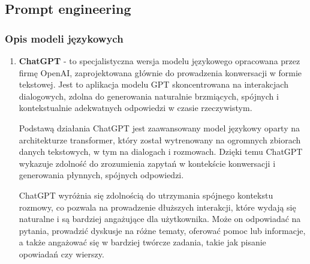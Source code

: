 \clearpage

\subsection{Prompt engineering}

\subsubsection{Opis modeli językowych}

\begin{enumerate}
 \item {\bf ChatGPT} - to specjalistyczna wersja modelu językowego opracowana przez firmę OpenAI, zaprojektowana głównie do prowadzenia konwersacji w formie tekstowej. Jest to aplikacja modelu GPT skoncentrowana na interakcjach dialogowych, zdolna do generowania naturalnie brzmiących, spójnych i kontekstualnie adekwatnych odpowiedzi w czasie rzeczywistym.

    Podstawą działania ChatGPT jest zaawansowany model językowy oparty na architekturze transformer, który został wytrenowany na ogromnych zbiorach danych tekstowych, w tym na dialogach i rozmowach. Dzięki temu ChatGPT wykazuje zdolność do zrozumienia zapytań w kontekście konwersacji i generowania płynnych, spójnych odpowiedzi.
    
    ChatGPT wyróżnia się zdolnością do utrzymania spójnego kontekstu rozmowy, co pozwala na prowadzenie dłuższych interakcji, które wydają się naturalne i są bardziej angażujące dla użytkownika. Może on odpowiadać na pytania, prowadzić dyskusje na różne tematy, oferować pomoc lub informacje, a także angażować się w bardziej twórcze zadania, takie jak pisanie opowiadań czy wierszy.
    

\end{enumerate}

